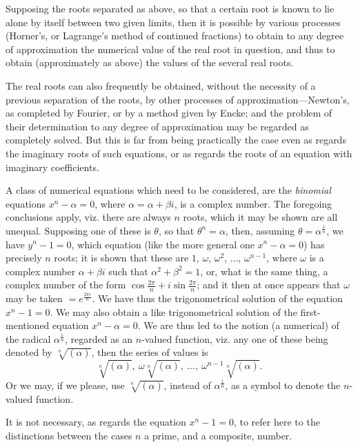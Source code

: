 \documentclass[12pt,a4paper]{article}
\theoremstyle{plain}
\theoremstyle{definition}
\theoremstyle{remark}
\begin{document}
Supposing the roots separated as above, so that a certain root is known to lie alone by itself between two given limits, then it is possible by various processes (Horner's, or Lagrange's method of continued fractions) to obtain to any degree of approximation the numerical value of the real root in question, and thus to obtain (approximately as above) the values of the several real roots.

The real roots can also frequently be obtained, without the necessity of a previous separation of the roots, by other processes of approximation---Newton's, as completed by Fourier, or by a method given by Encke; and the problem of their determination to any degree of approximation may be regarded as completely solved. But this is far from being practically the case even as regards the imaginary roots of such equations, or as regards the roots of an equation with imaginary coefficients.

A class of numerical equations which need to be considered, are the \textit{binomial} equations $x^n - \alpha = 0$, where $\alpha = \alpha + \beta i$, is a complex number. The foregoing conclusions apply, viz. there are always $n$ roots, which it may be shown are all unequal. Supposing one of these is $\theta$, so that $\theta^n = \alpha$, then, assuming $\theta = \alpha^{\frac{1}{n}}$, we have $y^n - 1 = 0$, which equation (like the more general one $x^n - \alpha = 0$) has precisely $n$ roots; it is shown that these are $1$, $\omega$, $\omega^2$, $\ldots$, $\omega^{n-1}$, where $\omega$ is a complex number $\alpha + \beta i$ such that $\alpha^2 + \beta^2 = 1$, or, what is the same thing, a complex number of the form $\cos\frac{2\pi}{n} + i\sin\frac{2\pi}{n}$; and it then at once appears that $\omega$ may be taken $= e^{\frac{2\pi i}{n}}$. We have thus the trigonometrical solution of the equation $x^n - 1 = 0$. We may also obtain a like trigonometrical solution of the first-mentioned equation $x^n - \alpha = 0$. We are thus led to the notion (a numerical) of the radical $\alpha^{\frac{1}{n}}$, regarded as an $n$-valued function, viz. any one of these being denoted by $\sqrt[n]{(\alpha)}$, then the series of values is
\[
\sqrt[n]{(\alpha)},\ \omega\sqrt[n]{(\alpha)},\ \ldots,\ \omega^{n-1}\sqrt[n]{(\alpha)}.
\]
Or we may, if we please, use $\sqrt[n]{(\alpha)}$, instead of $\alpha^{\frac{1}{n}}$, as a symbol to denote the $n$-valued function.

It is not necessary, as regards the equation $x^n - 1 = 0$, to refer here to the distinctions between the cases $n$ a prime, and a composite, number.
\end{document}
